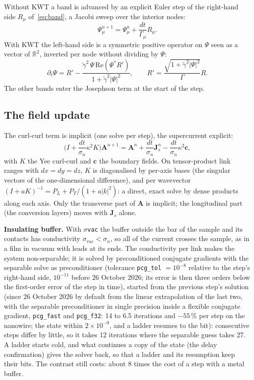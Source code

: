 \documentclass[11pt,a4paper]{article}
\newcommand{\code}[1]{\texttt{#1}}
\newcommand{\gt}{\tilde\gamma}
\begin{document}
Without KWT a band is advanced by an explicit Euler step of the right-hand side $R_\mu$ of~\eqref{eq:band}, a Jacobi
sweep over the interior nodes:
\begin{equation}
  \Psi_\mu^{n+1} = \Psi_\mu^n + \frac{dt}{\Gamma_\mu} R_\mu .
\end{equation}
With KWT the left-hand side is a symmetric positive operator on $\Psi$ seen as a vector of $\mathbb R^2$, inverted per
node without dividing by $\Psi$:
\begin{equation}
  \partial_t\Psi = R' - \frac{\gt^2\,\Psi\,\mathrm{Re}(\Psi^* R')}{1+\gt^2|\Psi|^2}, \qquad
  R' = \frac{\sqrt{1+\gt^2|\Psi|^2}}{\Gamma} R .
\end{equation}
The other bands enter the Josephson term at the start of the step.

\subsection{The field update}

The curl-curl term is implicit (one solve per step), the supercurrent explicit:
\begin{equation}
  \Big(I + \frac{dt}{\sigma_n}\kappa^2 K\Big)\mathbf A^{n+1} = \mathbf A^n + \frac{dt}{\sigma_n}\mathbf J_s^n
  - \frac{dt}{\sigma_n}\kappa^2 \mathbf c ,
\end{equation}
with $K$ the Yee curl-curl and $\mathbf c$ the boundary fields. On tensor-product link ranges with $dx = dy = dz$, $K$
is diagonalised by per-axis bases (the singular vectors of the one-dimensional difference), and per wavevector
$(I + aK)^{-1} = P_L + P_T/(1 + a|k|^2)$: a direct, exact solve by dense products along each axis. Only the transverse
part of $\mathbf A$ is implicit; the longitudinal part (the conversion layers) moves with $\mathbf J_s$ alone.

\textbf{Insulating buffer.} With \code{\(\sigma\)vac} the buffer outside the bar of the sample and its contacts has
conductivity $\sigma_{\mathrm{vac}} < \sigma_n$, so all of the current crosses the sample, as in a film in vacuum with
leads at its ends. The conductivity per link makes the system non-separable; it is solved by preconditioned conjugate
gradients with the separable solve as preconditioner (tolerance \code{pcg\_tol} $= 10^{-8}$ relative to the step's right-hand
side, $10^{-11}$ before 26 October 2026; its error is then three orders below the first-order error of the step in time), started
from the previous step's solution (since 26 October 2026 by default from the linear extrapolation of the last two, with the
separable preconditioner in single precision inside a flexible conjugate gradient, \code{pcg\_fast} and \code{pcg\_f32}: 14 to 6.5
iterations and $-55\,\%$ per step on the nanowire; the state within $2\times10^{-9}$, and a ladder resumes to the bit):
consecutive steps differ by little, so it takes 12 iterations where the separable guess takes 27. A ladder starts cold,
and what continues a copy of the state (the delay confirmation) gives the solver back, so that a ladder and its
resumption keep their bits. The contrast still costs: about 8 times the cost of a step with a metal buffer.
\end{document}
